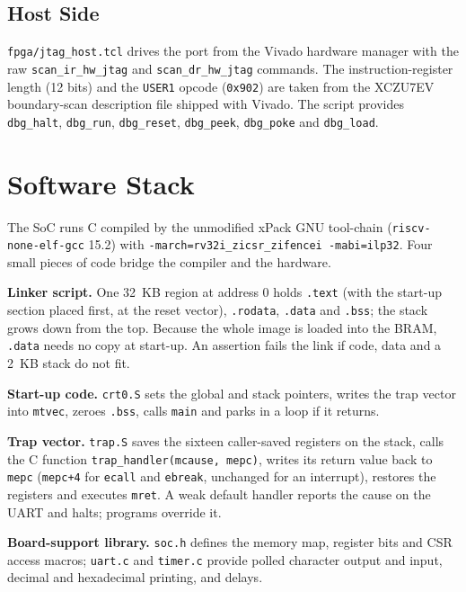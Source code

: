 \documentclass[journal,10pt]{IEEEtran}
\newcommand{\reg}[1]{\texttt{#1}}
\begin{document}
\subsection{Host Side}
\reg{fpga/jtag\_host.tcl} drives the port from the Vivado hardware manager
with the raw \reg{scan\_ir\_hw\_jtag} and \reg{scan\_dr\_hw\_jtag} commands.
The instruction-register length (12 bits) and the \reg{USER1} opcode
(\reg{0x902}) are taken from the XCZU7EV boundary-scan description file
shipped with Vivado. The script provides \reg{dbg\_halt}, \reg{dbg\_run},
\reg{dbg\_reset}, \reg{dbg\_peek}, \reg{dbg\_poke} and \reg{dbg\_load}.

\section{Software Stack}\label{sec:sw}
The SoC runs C compiled by the unmodified xPack GNU tool-chain
(\reg{riscv-none-elf-gcc} 15.2) with \reg{-march=rv32i\_zicsr\_zifencei
-mabi=ilp32}. Four small pieces of code bridge the compiler and the
hardware.

\textbf{Linker script.} One 32~KB region at address 0 holds \reg{.text}
(with the start-up section placed first, at the reset vector), \reg{.rodata},
\reg{.data} and \reg{.bss}; the stack grows down from the top. Because the
whole image is loaded into the BRAM, \reg{.data} needs no copy at start-up.
An assertion fails the link if code, data and a 2~KB stack do not fit.

\textbf{Start-up code.} \reg{crt0.S} sets the global and stack pointers,
writes the trap vector into \reg{mtvec}, zeroes \reg{.bss}, calls
\reg{main} and parks in a loop if it returns.

\textbf{Trap vector.} \reg{trap.S} saves the sixteen caller-saved registers
on the stack, calls the C function \reg{trap\_handler(mcause, mepc)},
writes its return value back to \reg{mepc} (\reg{mepc+4} for \reg{ecall} and
\reg{ebreak}, unchanged for an interrupt), restores the registers and
executes \reg{mret}. A weak default handler reports the cause on the UART
and halts; programs override it.

\textbf{Board-support library.} \reg{soc.h} defines the memory map, register
bits and CSR access macros; \reg{uart.c} and \reg{timer.c} provide polled
character output and input, decimal and hexadecimal printing, and delays.
\end{document}
